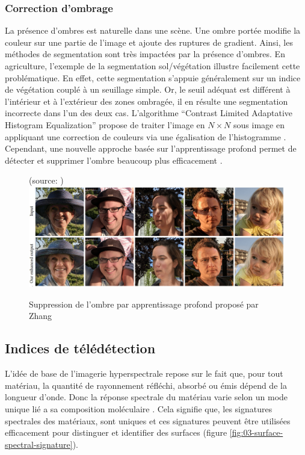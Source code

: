 \documentclass[../thesis.tex]{subfiles}
\begin{document}
    \subsubsection{Correction d'ombrage} La présence d'ombres est naturelle dans une scène. Une ombre portée modifie la couleur sur une partie de l'image et ajoute des ruptures de gradient. Ainsi, les méthodes de segmentation sont très impactées par la présence d'ombres. En agriculture, l'exemple de la segmentation sol/végétation illustre facilement cette problématique. En effet, cette segmentation s'appuie généralement sur un indice de végétation couplé à un seuillage simple. Or, le seuil adéquat est différent à l'intérieur et à l'extérieur des zones ombragée, il en résulte une segmentation incorrecte dans l'un des deux cas. L'algorithme ``Contrast Limited Adaptative Histogram Equalization'' propose de traiter l'image en $N \times N$ sous image en appliquant une correction de couleurs via une égalisation de l'histogramme \cite{Zuiderveld:1994:CLA:180895.180940}. Cependant, une nouvelle approche basée sur l'apprentissage profond permet de détecter et supprimer l'ombre beaucoup plus efficacement \cite{zhang2020portrait}.
    
    \begin{figure}[H]
        \centering
        {\scriptsize (source: \cite{zhang2020portrait})} \\
        \includegraphics[width=0.7\linewidth]{img/biblio/shadow-removal}
        \caption{Suppression de l'ombre par apprentissage profond proposé par Zhang}
        \label{fig:03-shadow-removal}
    \end{figure}
    
    \subsection{Indices de télédétection}
    \label{sec:vegetation-indices}
    
    L'idée de base de l'imagerie hyperspectrale repose sur le fait que, pour tout matériau, la quantité de rayonnement réfléchi, absorbé ou émis dépend de la longueur d'onde. Donc la réponse spectrale du matériau varie selon un mode unique lié a sa composition moléculaire \cite{Mercan2011}. Cela signifie que, les signatures spectrales des matériaux, sont uniques et ces signatures peuvent être utilisées efficacement pour distinguer et identifier des surfaces (figure \ref{fig:03-surface-spectral-signature}).
    
\end{document}
